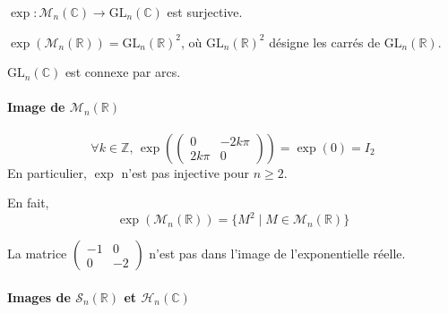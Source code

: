   \begin{theorem}
    $\exp : \mathcal{M}_n(\mathbb{C}) \rightarrow \mathrm{GL}_n(\mathbb{C})$ est surjective.
  \end{theorem}
  
  \begin{application}
    $\exp(\mathcal{M}_n(\mathbb{R})) = \mathrm{GL}_n(\mathbb{R})^2$, où $\mathrm{GL}_n(\mathbb{R})^2$ désigne les carrés de $\mathrm{GL}_n(\mathbb{R})$.
  \end{application}
  
  
  \begin{application}
    $\mathrm{GL}_n(\mathbb{C})$ est connexe par arcs.
  \end{application}
  
  \paragraph{Image de \texorpdfstring{$\mathcal{M}_n(\mathbb{R})$}{Mₙ(R)}}
  
  
  \begin{example}
    \[ \forall k \in \mathbb{Z}, \, \exp \left( \begin{pmatrix} 0 & -2k\pi \\ 2k\pi & 0 \end{pmatrix} \right) = \exp(0) = I_2 \]
    En particulier, $\exp$ n'est pas injective pour $n \geq 2$.
  \end{example}
  
  \begin{proposition}
    En fait,
    \[ \exp(\mathcal{M}_n(\mathbb{R})) = \{ M^2 \mid M \in \mathcal{M}_n(\mathbb{R}) \} \]
  \end{proposition}
  
  \begin{example}
    La matrice $\begin{pmatrix} -1 & 0 \\ 0 & -2 \end{pmatrix}$ n'est pas dans l'image de l'exponentielle réelle.
  \end{example}
  
  \paragraph{Images de $\mathcal{S}_n(\mathbb{R})$ et $\mathcal{H}_n(\mathbb{C})$}
  
